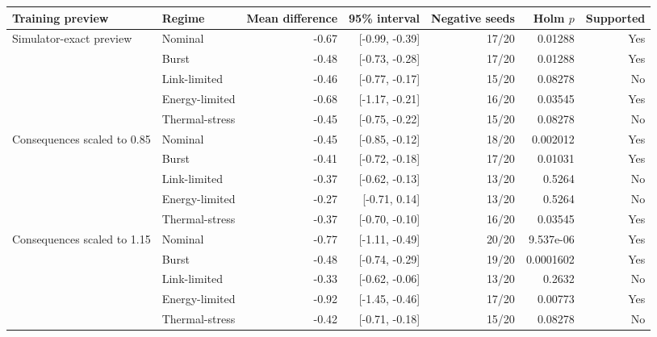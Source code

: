 \begin{tabular}{llrrrrr}
\toprule
Training preview & Regime & Mean difference & 95\% interval & Negative seeds & Holm $p$ & Supported \\
\midrule
Simulator-exact preview & Nominal & -0.67 & [-0.99, -0.39] & 17/20 & 0.01288 & Yes \\
 & Burst & -0.48 & [-0.73, -0.28] & 17/20 & 0.01288 & Yes \\
 & Link-limited & -0.46 & [-0.77, -0.17] & 15/20 & 0.08278 & No \\
 & Energy-limited & -0.68 & [-1.17, -0.21] & 16/20 & 0.03545 & Yes \\
 & Thermal-stress & -0.45 & [-0.75, -0.22] & 15/20 & 0.08278 & No \\
\addlinespace
Consequences scaled to 0.85 & Nominal & -0.45 & [-0.85, -0.12] & 18/20 & 0.002012 & Yes \\
 & Burst & -0.41 & [-0.72, -0.18] & 17/20 & 0.01031 & Yes \\
 & Link-limited & -0.37 & [-0.62, -0.13] & 13/20 & 0.5264 & No \\
 & Energy-limited & -0.27 & [-0.71, 0.14] & 13/20 & 0.5264 & No \\
 & Thermal-stress & -0.37 & [-0.70, -0.10] & 16/20 & 0.03545 & Yes \\
\addlinespace
Consequences scaled to 1.15 & Nominal & -0.77 & [-1.11, -0.49] & 20/20 & 9.537e-06 & Yes \\
 & Burst & -0.48 & [-0.74, -0.29] & 19/20 & 0.0001602 & Yes \\
 & Link-limited & -0.33 & [-0.62, -0.06] & 13/20 & 0.2632 & No \\
 & Energy-limited & -0.92 & [-1.45, -0.46] & 17/20 & 0.00773 & Yes \\
 & Thermal-stress & -0.42 & [-0.71, -0.18] & 15/20 & 0.08278 & No \\
\bottomrule
\end{tabular}